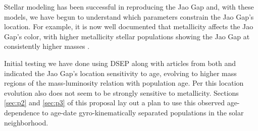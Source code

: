 Stellar modeling has been successful in reproducing the Jao Gap
\citep[e.g.][]{Feiden2021,Mansfield2021} and, with these models, we have begun
to understand which parameters constrain the Jao Gap's location. For example,
it is now well documented that metallicity affects the Jao Gap's color, with
higher metallicity stellar populations showing the Jao Gap at consistently
higher masses \citep{Mansfield2021}.

Initial testing we have done using DSEP along with articles from both
\citeauthor{Feiden2021} and \citeauthor{Mansfield2021} indicated the Jao Gap's
location sensitivity to age, evolving to higher mass regions of the
mass-luminosity relation with population age. Per \citet{Mansfield2021} this
location evolution also does not seem to be strongly sensitive to metallicity.
Sections \ref{sec:p2} and \ref{sec:p3} of this proposal lay out a plan to use this observed
age-dependence to age-date gyro-kinematically separated populations in the solar
neighborhood.

